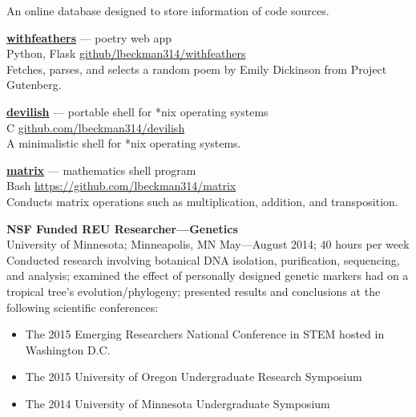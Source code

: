 \documentclass[a4paper]{article}
\begin{document}
An online database designed to store information of code sources.


\textcolor[RGB]{128,128,128}{\dotfill}
\medbreak

\textbf{\href{https://withfeathers.liambeckman.com}{withfeathers}} --- poetry web app\\
\textcolor[RGB]{128,128,128}{Python, Flask \hfill \href{https://github.com/lbeckman314/withfeathers}{github/lbeckman314/withfeathers}}\\

Fetches, parses, and selects a random poem by Emily Dickinson from Project Gutenberg.


\textcolor[RGB]{128,128,128}{\dotfill}
\medbreak

\textbf{\href{https://liambeckman.com/code/devilish}{devilish}} --- portable shell for *nix operating systems\\
\textcolor[RGB]{128,128,128}{C \hfill \href{https://github.com/lbeckman314/devilsh}{github.com/lbeckman314/devilish}}\\

A minimalistic shell for *nix operating systems.

\textcolor[RGB]{128,128,128}{\dotfill}
\medbreak

\textbf{\href{https://liambeckman.com/code/matrix}{matrix}} --- mathematics shell program\\
\textcolor[RGB]{128,128,128}{Bash \hfill \href{https://github.com/lbeckman314/matrix}{https://github.com/lbeckman314/matrix}}\\

Conducts matrix operations such as multiplication, addition, and transposition.

\textcolor[RGB]{128,128,128}{\dotfill}
\medbreak

\textbf{NSF Funded REU Researcher—Genetics}\\
\textcolor[RGB]{128,128,128}{University of Minnesota; Minneapolis, MN \hfill  May—August 2014; 40 hours per week}\\
Conducted research involving botanical DNA isolation, purification, sequencing, and analysis; examined the effect of personally designed genetic markers had on a tropical tree's evolution/phylogeny; presented results and conclusions at the following scientific conferences:\\ 
\begin{itemize}
\item The 2015 Emerging Researchers National Conference in STEM hosted in Washington D.C.
\item The 2015 University of Oregon Undergraduate Research Symposium
\item The 2014 University of Minnesota Undergraduate Symposium
\end{itemize}
\end{document}
